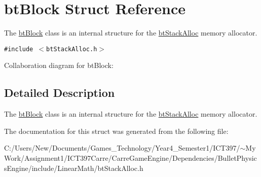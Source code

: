 \hypertarget{structbt_block}{
\section{btBlock Struct Reference}
\label{structbt_block}
}
The \hyperlink{structbt_block}{btBlock} class is an internal structure for the \hyperlink{classbt_stack_alloc}{btStackAlloc} memory allocator.  


{\tt \#include $<$btStackAlloc.h$>$}

Collaboration diagram for btBlock:

\subsection{Detailed Description}
The \hyperlink{structbt_block}{btBlock} class is an internal structure for the \hyperlink{classbt_stack_alloc}{btStackAlloc} memory allocator. 

The documentation for this struct was generated from the following file:\begin{CompactItemize}
\item 
C:/Users/New/Documents/Games\_\-Technology/Year4\_\-Semester1/ICT397/$\sim$My Work/Assignment1/ICT397Carre/CarreGameEngine/Dependencies/BulletPhysicsEngine/include/LinearMath/btStackAlloc.h\end{CompactItemize}
